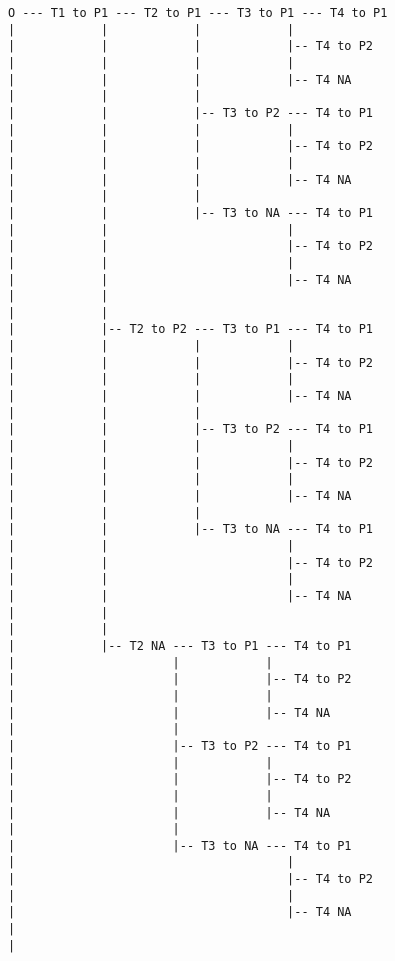 \documentclass{article}
\begin{document}
\begin{enumerate}
\begin{enumerate}
			\begin{verbatim}
			O --- T1 to P1 --- T2 to P1 --- T3 to P1 --- T4 to P1
			|            |            |            |
			|            |            |            |-- T4 to P2
			|            |            |            |
			|            |            |            |-- T4 NA
			|            |            |            
			|            |            |-- T3 to P2 --- T4 to P1
			|            |            |            |
			|            |            |            |-- T4 to P2
			|            |            |            |
			|            |            |            |-- T4 NA
			|            |            |
			|            |            |-- T3 to NA --- T4 to P1
			|            |                         |
			|            |                         |-- T4 to P2
			|            |                         |
			|            |                         |-- T4 NA
			|            |
			|            |
			|            |-- T2 to P2 --- T3 to P1 --- T4 to P1
			|            |            |            |
			|            |            |            |-- T4 to P2
			|            |            |            |
			|            |            |            |-- T4 NA
			|            |            |            
			|            |            |-- T3 to P2 --- T4 to P1
			|            |            |            |
			|            |            |            |-- T4 to P2
			|            |            |            |
			|            |            |            |-- T4 NA
			|            |            |
			|            |            |-- T3 to NA --- T4 to P1
			|            |                         |
			|            |                         |-- T4 to P2
			|            |                         |
			|            |                         |-- T4 NA
			|            |
			|            |
			|            |-- T2 NA --- T3 to P1 --- T4 to P1
			|                      |            |
			|                      |            |-- T4 to P2
			|                      |            |
			|                      |            |-- T4 NA
			|                      |            
			|                      |-- T3 to P2 --- T4 to P1
			|                      |            |
			|                      |            |-- T4 to P2
			|                      |            |
			|                      |            |-- T4 NA
			|                      |
			|                      |-- T3 to NA --- T4 to P1
			|                                      |
			|                                      |-- T4 to P2
			|                                      |
			|                                      |-- T4 NA
			|             
			|             

\end{verbatim}
\end{enumerate}
\end{enumerate}
\end{document}
